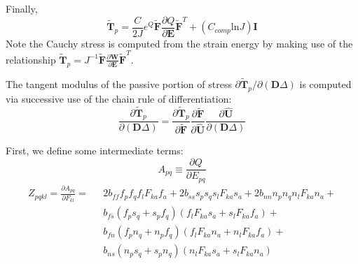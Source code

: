 Finally,
\begin{equation}
\tilde{\bm{T}}_p = \frac{C}{2J}e^{Q}\tilde{\bm{F}}\frac{\partial{Q}}{\partial{\bm{E}}}\tilde{\bm{F}}^T + (C_{comp}\text{ln}J)\bm{I}
\end{equation}
Note the Cauchy stress is computed from the strain energy by making use of the relationship $\tilde{\bm{T}}_p = J^{-1}\tilde{\bm{F}}\frac{\partial\bm{W}}{\partial \bm{E}} \tilde{\bm{F}}^T$. 

The tangent modulus of the passive portion of stress ${\partial \tilde{\bm{T}}_p}/{\partial (\bm{D}\Delta)}$ is computed via successive use of the chain rule of differentiation:
\begin{equation}
\frac{\partial \tilde{\bm{T}}_p}{\partial (\bm{D}\Delta)} = \frac{\partial \tilde{\bm{T}}_p}{\partial \tilde{\bm{F}}}\frac{\partial \tilde{\bm{F}}}{\partial \hat{\bm{U}}}\frac{\partial \hat{\bm{U}}}{\partial (\bm{D}\Delta)}
\label{eqn:tanmod}
\end{equation}

First, we define some intermediate terms:
\begin{equation}
A_{pq} \equiv \frac{\partial Q}{\partial E_{pq}}
\end{equation}
\begin{equation}
\begin{aligned}
Z_{pqkl} = \frac{\partial A_{pq}}{\partial F_{kl}} = \text{\ } &2b_{ff}f_pf_qf_lF_{ka}f_a + 2b_{ss}s_ps_qs_lF_{ka}s_a + 2b_{nn}n_pn_qn_lF_{ka}n_a +\\
& b_{fs}\left(f_ps_q + s_pf_q\right)\left(f_lF_{ka}s_a + s_lF_{ka}f_a\right) +\\
& b_{fn}\left(f_pn_q + n_pf_q\right)\left(f_lF_{ka}n_a + n_lF_{ka}f_a\right) +\\
& b_{ns}\left(n_ps_q + s_pn_q\right)\left(n_lF_{ka}s_a + s_lF_{ka}n_a\right)
\end{aligned}
\end{equation}

